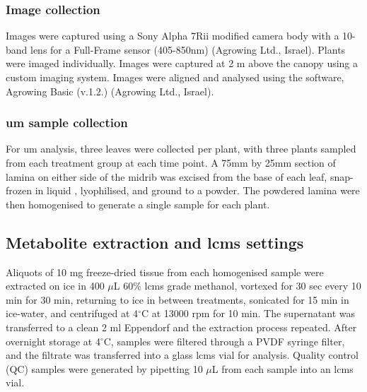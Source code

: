 \subsubsection{Image collection}
Images were captured using a Sony Alpha 7Rii modified camera body with a 10-band lens for a Full-Frame sensor (405-850nm) (Agrowing Ltd., Israel). Plants were imaged individually. Images were captured at 2 m above the canopy using a custom imaging system. Images were aligned and analysed using the software, Agrowing Basic (v.1.2.) (Agrowing Ltd., Israel). 

\subsubsection{\Acl{um} sample collection}
For \ac{um} analysis, three leaves were collected per plant, with three plants sampled from each treatment group at each time point. A 75mm by 25mm section of lamina on either side of the midrib was excised from the base of each leaf, snap-frozen in liquid , lyophilised, and ground to a powder. The powdered lamina were then homogenised to generate a single sample for each plant. 



\subsection{Metabolite extraction and \ac{lcms} settings}
Aliquots of 10 mg freeze-dried tissue from each homogenised sample were extracted on ice in 400 \(\mu\)L 60\% \ac{lcms} grade methanol, vortexed for 30 sec every 10 min for 30 min, returning to ice in between treatments, sonicated for 15 min in ice-water, and centrifuged at 4$^{\circ}$C at 13000 \ac{rpm} for 10 min. The supernatant was transferred to a clean 2 ml Eppendorf and the extraction process repeated. After overnight storage at 4$^{\circ}$C, samples were filtered through a PVDF syringe filter, and the filtrate was transferred into a glass \ac{lcms} vial for analysis. Quality control (QC) samples were generated by pipetting 10 \(\mu\)L from each sample into an \ac{lcms} vial. 

